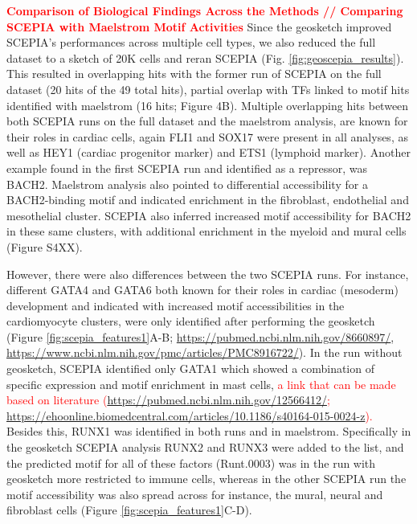 \textcolor{red}{\textbf{Comparison of Biological Findings Across the Methods // Comparing SCEPIA with Maelstrom Motif Activities} }
Since the geosketch improved SCEPIA's performances across multiple cell types, we also reduced the full dataset to a sketch of 20K cells and reran SCEPIA (Fig. \ref{fig:geoscepia_results}). This resulted in overlapping hits with the former run of SCEPIA on the full dataset (20 hits of the 49 total hits), partial overlap with TFs linked to motif hits identified with maelstrom (16 hits; Figure 4B). Multiple overlapping hits between both SCEPIA runs on the full dataset and the maelstrom analysis, are known for their roles in cardiac cells, again FLI1 and SOX17 were present in all analyses, as well as HEY1 (cardiac progenitor marker) and ETS1 (lymphoid marker). Another example found in the first SCEPIA run and identified as a repressor, was BACH2. Maelstrom analysis also pointed to differential accessibility for a BACH2-binding motif and indicated enrichment in the fibroblast, endothelial and mesothelial cluster. SCEPIA also inferred increased motif accessibility for BACH2 in these same clusters, with additional enrichment in the myeloid and mural cells (Figure S4XX). 

However, there were also differences between the two SCEPIA runs. For instance, different GATA4 and GATA6 both known for their roles in cardiac (mesoderm) development and indicated with increased motif accessibilities in the cardiomyocyte clusters, were only identified after performing the geosketch (Figure \ref{fig:scepia_features1}A-B; \href{https://pubmed.ncbi.nlm.nih.gov/8660897/}{https://pubmed.ncbi.nlm.nih.gov/8660897/}, \href{https://www.ncbi.nlm.nih.gov/pmc/articles/PMC8916722/}{https://www.ncbi.nlm.nih.gov/pmc/articles/PMC8916722/}). In the run without geosketch, SCEPIA identified only GATA1 which showed a combination of specific expression and motif enrichment in mast cells,\textcolor{red}{ a link that can be made based on literature (\href{https://pubmed.ncbi.nlm.nih.gov/12566412/}{https://pubmed.ncbi.nlm.nih.gov/12566412/}; \href{https://ehoonline.biomedcentral.com/articles/10.1186/s40164-015-0024-z}{https://ehoonline.biomedcentral.com/articles/10.1186/s40164-015-0024-z}).} Besides this, RUNX1 was identified in both runs and in maelstrom. Specifically in the geosketch SCEPIA analysis RUNX2 and RUNX3 were added to the list, and the predicted motif for all of these factors (Runt.0003) was in the run with geosketch more restricted to immune cells, whereas in the other SCEPIA run the motif accessibility was also spread across for instance, the mural, neural and fibroblast cells (Figure \ref{fig:scepia_features1}C-D). 

